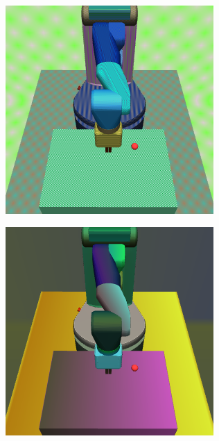 \begin{figure}
  \centering
  \begin{subfigure}{0.32\columnwidth}
    \includegraphics[width=\linewidth]{figures/chapter6/rand_checker.png}
  \end{subfigure}
  \begin{subfigure}{0.32\columnwidth}
    \includegraphics[width=\linewidth]{figures/chapter6/rand_gradient.png}
  \end{subfigure}


\end{figure}
